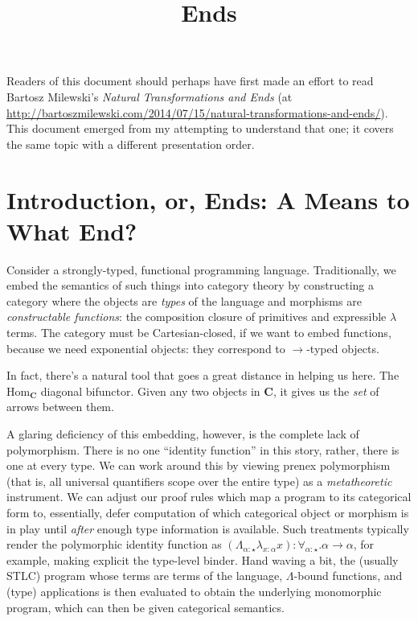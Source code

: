 \documentclass[letterpaper]{article}
\title{Ends}
\begin{document}
Readers of this document should perhaps have first made an effort to read
Bartosz Milewski's \textit{Natural Transformations and Ends} (at
\url{http://bartoszmilewski.com/2014/07/15/natural-transformations-and-ends/}).
This document emerged from my attempting to understand that one; it covers
the same topic with a different presentation order.

\section{Introduction, or, Ends: A Means to What End?}

Consider a strongly-typed, functional programming language.  Traditionally,
we embed the semantics of such things into category theory by constructing a
category where the objects are {\em types} of the language and morphisms are
{\em constructable functions}: the composition closure of primitives and
expressible $\lambda$ terms.  The category must be Cartesian-closed, if we
want to embed functions, because we need exponential objects: they
correspond to $\to$-typed objects.

In fact, there's a natural tool that goes a great distance in helping us
here.  The $\text{Hom}_{\mathbf{C}}$ diagonal bifunctor.  Given any two
objects in $\mathbf{C}$, it gives us the {\em set} of arrows between them.

A glaring deficiency of this embedding, however, is the complete lack of
polymorphism.  There is no one ``identity function'' in this story, rather,
there is one at every type.  We can work around this by viewing prenex
polymorphism (that is, all universal quantifiers scope over the entire type)
as a {\em metatheoretic} instrument.  We can adjust our proof rules which
map a program to its categorical form to, essentially, defer computation of
which categorical object or morphism is in play until {\em after} enough
type information is available.  Such treatments typically render the
polymorphic identity function as $(\Lambda_{\alpha : \star} \lambda_{x :
\alpha} x) : \forall_{\alpha : \star} . \alpha \to \alpha$, for example,
making explicit the type-level binder.  Hand waving a bit, the (usually
STLC) program whose terms are terms of the language, $\Lambda$-bound
functions, and (type) applications is then evaluated to obtain the
underlying monomorphic program, which can then be given categorical
semantics.
\end{document}
